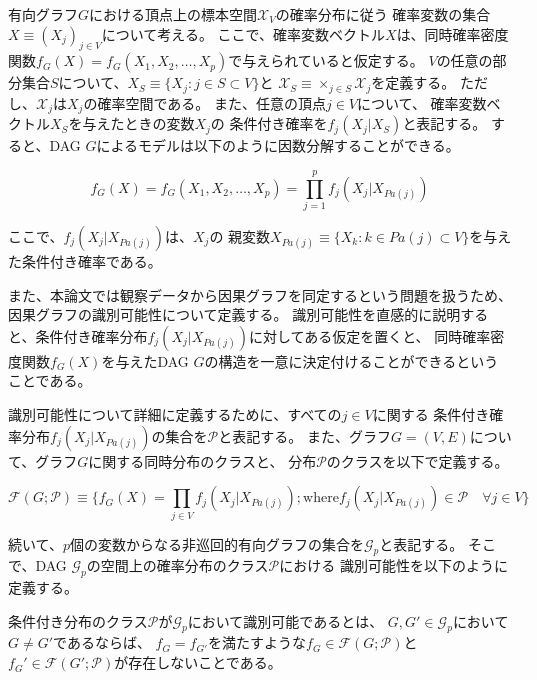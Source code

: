 有向グラフ$G$における頂点上の標本空間$\mathcal X_V$の確率分布に従う
確率変数の集合$X \equiv (X_j)_{j \in V}$について考える。
ここで、確率変数ベクトル$X$は、同時確率密度関数$f_G(X)=f_G(X_1, X_2, \dots, X_p)$で与えられていると仮定する。
$V$の任意の部分集合$S$について、$X_S \equiv \{X_j:j\in S \subset V \}$と
$\mathcal X_S \equiv \times_{j \in S} \mathcal X_j$を定義する。
ただし、$\mathcal X_j$は$X_j$の確率空間である。
また、任意の頂点$j\in V$について、
確率変数ベクトル$X_S$を与えたときの変数$X_j$の
条件付き確率を$f_j(X_j|X_S)$と表記する。
すると、DAG $G$によるモデルは以下のように因数分解することができる\cite{Pearl2009-oh}。

\begin{equation}
  f_G(X)=f_G(X_1, X_2, \dots, X_p) = \prod_{j=1}^p f_j(X_j | X_{Pa(j)})
  \label{eq:factorization}
\end{equation}

ここで、$f_j(X_j | X_{Pa(j)})$は、$X_j$の
親変数$X_{Pa(j)} \equiv \{ X_k:k\in Pa(j) \subset V \}$を与えた条件付き確率である。

また、本論文では観察データから因果グラフを同定するという問題を扱うため、
因果グラフの識別可能性について定義する。
識別可能性を直感的に説明すると、条件付き確率分布$f_j(X_j|X_{Pa(j)})$に対してある仮定を置くと、
同時確率密度関数$f_G(X)$を与えたDAG $G$の構造を一意に決定付けることができるということである。

識別可能性について詳細に定義するために、すべての$j \in V$に関する
条件付き確率分布$f_j(X_j|X_{Pa(j)})$の集合を$\mathcal P$と表記する。
また、グラフ$G=(V,E)$について、グラフ$G$に関する同時分布のクラスと、
分布$\mathcal P$のクラスを以下で定義する。

\begin{equation}
  \mathcal F(G;\mathcal P) \equiv \{ f_G(X) = \prod_{j \in V} f_j(X_j|X_{Pa(j)}) ;
  \text{where} f_j(X_j|X_{Pa(j)}) \in \mathcal P \quad \forall j \in V \}
\end{equation}

続いて、$p$個の変数からなる非巡回的有向グラフの集合を$\mathcal G_p$と表記する。
そこで、DAG $\mathcal G_p$の空間上の確率分布のクラス$\mathcal P$における
識別可能性を以下のように定義する。

\begin{df}[識別可能性]
  条件付き分布のクラス$\mathcal P$が$\mathcal G_p$において識別可能であるとは、
  $G,G' \in \mathcal G_p$において$G \neq G'$であるならば、
  $f_G = f_{G'}$を満たすような$f_G \in \mathcal F(G; \mathcal P)$と
  $f_G' \in \mathcal F(G'; \mathcal P)$が存在しないことである。
\end{df}
